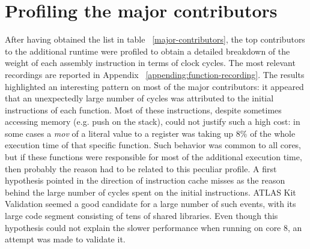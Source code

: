 \documentclass[a4paper]{jpconf}
\begin{document}
\section{Profiling the major contributors}
After having obtained the list in table ~\ref{major-contributors}, the 
top contributors to the additional runtime were profiled to obtain
a detailed breakdown of the weight of each assembly instruction in terms of 
clock cycles. The most relevant recordings are reported in Appendix  
~\ref{appending:function-recording}. The results highlighted an interesting 
pattern on most of the major contributors:  it appeared that an unexpectedly 
large number of cycles was attributed to the initial instructions of each function.
Most of these instructions, despite sometimes accessing memory 
(e.g. push on the stack), could not justify such a high cost: in some cases a 
\textit{mov} of a literal value to a register was taking up 8\% of the whole 
execution time of that specific function. Such behavior was common to all cores,
but if these functions were responsible for most of the additional execution time,
then probably the reason had to be related to this peculiar profile. A first hypothesis
pointed in the direction of instruction cache misses as the reason behind
the large number of cycles spent on the initial instructions.
ATLAS Kit Validation seemed a good candidate for a large number of  such events,
with its large code segment consisting of tens of shared libraries. Even though
this hypothesis could not explain the slower performance when running on core 8,
an attempt was made to validate it.
 
\end{document}
